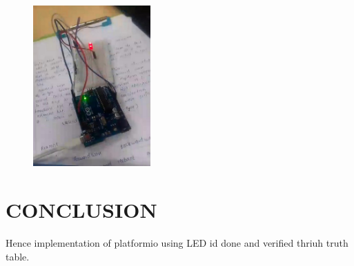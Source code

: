 \documentclass[conference]{IEEEtran}                   \IEEEoverridecommandlockouts
\begin{document}
\begin{figure}[h]
	\centering
	\includegraphics[width=0.4\textwidth]{2.jpg}
	\caption{\label{fig-5:Gates}}
\end{figure}
\section{CONCLUSION}
Hence implementation of platformio using LED id done and verified thriuh truth table.





	
	
\end{document}
